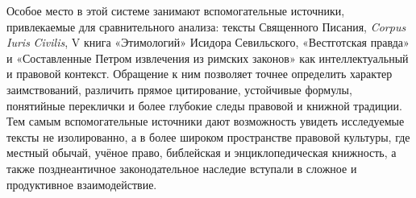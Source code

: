 Особое место в этой системе занимают вспомогательные источники, привлекаемые для сравнительного анализа: тексты Священного Писания, \emph{Corpus }\emph{Iuris}\emph{ Civilis}, V книга «Этимологий» Исидора Севильского, «Вестготская правда» и «Составленные Петром извлечения из римских законов» как интеллектуальный и правовой контекст. Обращение к ним позволяет точнее определить характер заимствований, различить прямое цитирование, устойчивые формулы, понятийные переклички и более глубокие следы правовой и книжной традиции. Тем самым вспомогательные источники дают возможность увидеть исследуемые тексты не изолированно, а в более широком пространстве правовой культуры, где местный обычай, учёное право, библейская и энциклопедическая книжность, а также позднеантичное законодательное наследие вступали в сложное и продуктивное взаимодействие.
